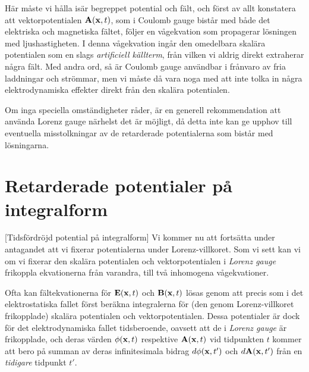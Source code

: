 H{\"a}r m{\aa}ste vi h{\aa}lla is{\"a}r begreppet potential och f{\"a}lt, och
f{\"o}rst av allt konstatera att vektorpotentialen ${\bf A}({\bf x},t)$, som i
Coulomb gauge bist{\aa}r med b{\aa}de det elektriska och magnetiska f{\"a}ltet,
f{\"o}ljer en v{\aa}gekvation som propagerar l{\"o}sningen med ljushastigheten.
I denna v{\aa}gekvation ing{\aa}r den omedelbara skal{\"a}ra potentialen som en
slags {\it artificiell k{\"a}llterm}, fr{\aa}n vilken vi aldrig direkt
extraherar n{\aa}gra f{\"a}lt. Med andra ord, s{\aa} {\"a}r Coulomb gauge
anv{\"a}ndbar i fr{\aa}nvaro av fria laddningar och str{\"o}mmar, men vi
m{\aa}ste d{\aa} vara noga med att inte tolka in n{\aa}gra elektrodynamiska
effekter direkt fr{\aa}n den skal{\"a}ra potentialen.

Om inga speciella omst{\"a}ndigheter r{\aa}der, {\"a}r en generell
rekommendation att anv{\"a}nda Lorenz gauge n{\"a}rhelst det {\"a}r
m{\"o}jligt, d{\aa} detta inte kan ge upphov till eventuella misstolkningar
av de retarderade potentialerna som bist{\aa}r med l{\"o}sningarna.
\vfill\eject

\section{Retarderade potentialer p{\aa} integralform}
[Tidsf{\"o}rdr{\"o}jd potential p{\aa} integralform]
Vi kommer nu att forts{\"a}tta under antagandet att vi fixerar potentialerna
under Lorenz-villkoret. Som vi sett kan vi om vi fixerar den skal{\"a}ra
potentialen och vektorpotentialen i {\it Lorenz gauge} frikoppla ekvationerna
fr{\aa}n varandra, till tv{\aa} inhomogena v{\aa}gekvationer.

Ofta kan f{\"a}ltekvationerna f{\"o}r ${\bf E}({\bf x},t)$ och
${\bf B}({\bf x},t)$ l{\"o}sas genom att precis som i det elektrostatiska
fallet f{\"o}rst ber{\"a}kna integralerna f{\"o}r (den genom Lorenz-villkoret
frikopplade) skal{\"a}ra potentialen och vektorpotentialen. Dessa potentialer
{\"a}r dock f{\"o}r det elektrodynamiska fallet tidsberoende, oavsett att de i
{\it Lorenz gauge} {\"a}r frikopplade, och deras v{\"a}rden $\phi({\bf x},t)$
respektive ${\bf A}({\bf x},t)$ vid tidpunkten $t$ kommer att bero p{\aa}
summan av deras infinitesimala bidrag
$d\phi({\bf x},t')$ och $d{\bf A}({\bf x},t')$ fr{\aa}n en {\it tidigare}
tidpunkt $t'$.

